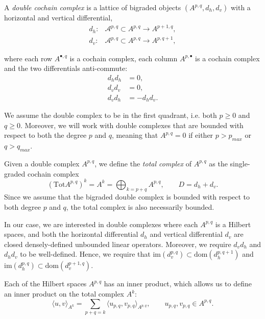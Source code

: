 \documentclass[reqno]{amsart}
\numberwithin{equation}{section}
\theoremstyle{definition}
\newcommand{\Ac}{\mathcal{A}}
\newcommand{\dom}{\mathrm{dom}}
\begin{document}
A \emph{double cochain complex} is a lattice of bigraded objects $(A^{p,q}, d_h, d_v)$ with a horizontal and vertical differential, 
\begin{subequations}    
\begin{align}
d_h: & \Ac^{p,q} \subset A^{p,q} \to A^{p+1,q}, \\
d_v: &\Ac^{p,q} \subset A^{p,q} \to A^{p,q+1},
\end{align}
\end{subequations}

where each row $A^{\bullet, q}$ is a cochain complex, each column $A^{p, \bullet}$ is a cochain complex and the two differentials anti-commute:
\begin{subequations}
\begin{align}
d_h d_h &= 0, \\
d_v d_v &= 0, \\
d_v d_h &= - d_h d_v.
\end{align}
\end{subequations}


We assume the double complex to be in the first quadrant, i.e. both $p \geq 0$ and $q \geq 0$. Moreover, we will work with double complexes that are bounded with respect to both the degree $p$ and $q$, meaning that $A^{p,q} = 0$ if either $p>p_{max}$ or $q>q_{max}$.

Given a double complex $A^{p,q}$, we define the \emph{total complex} of $A^{p,q}$ as the single-graded cochain complex 
\begin{equation}
(\mathrm{Tot}A^{p,q})^k = A^k = \bigoplus_{k = p + q} A^{p,q}, \qquad D = d_h + d_v.
\end{equation}
Since we assume that the bigraded double complex is bounded with respect to both degree $p$ and $q$, the total complex is also necessarily bounded.

In our case, we are interested in double complexes where each $A^{p,q}$ is a Hilbert spaces, and both the horizontal differential $d_h$ and vertical differential $d_v$ are closed densely-defined unbounded linear operators. Moreover, we require $d_v d_h$ and $d_h d_v$ to be well-defined. Hence, we require that $\mathrm{im}(d_v^{p,q}) \subset \dom(d_h^{p,q+1})$ and  $\mathrm{im}(d_h^{p,q}) \subset \dom(d_v^{p+1,q})$.

Each of the Hilbert spaces $A^{p,q}$ has an inner product, which allows us to define an inner product on the total complex $A^k$:
\begin{equation}
\langle u, v \rangle_{A^k} = \sum_{p+q=k}  \langle u_{p,q}, v_{p,q} \rangle_{A^{p,q}}, \qquad u_{p,q}, v_{p,q} \in A^{p,q}.
\label{eq: double inner product}
\end{equation}
\end{document}

